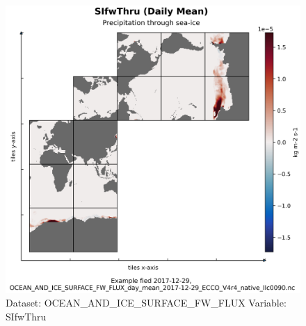 \begin{figure}[H]
\centering
\includegraphics[scale=0.55]{../images/plots/native_plots/Ocean_and_Sea-Ice_Surface_Freshwater_Fluxes/SIfwThru.png}
\caption{Dataset: OCEAN\_AND\_ICE\_SURFACE\_FW\_FLUX Variable: SIfwThru}
\label{tab:table-OCEAN_AND_ICE_SURFACE_FW_FLUX_SIfwThru-Plot}
\end{figure}
\pagebreak

